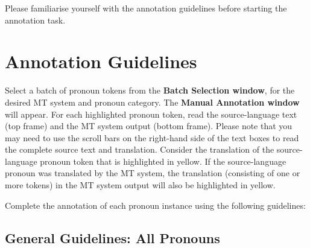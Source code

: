\documentclass[11pt]{article} %
\begin{document}
Please familiarise yourself with the annotation guidelines before starting the annotation task.

\section{Annotation Guidelines}
\label{AnnotationGuidelines}
Select a batch of pronoun tokens from the \textbf{Batch Selection window}, for the desired MT system and pronoun category. The \textbf{Manual Annotation window} will appear. For each highlighted pronoun token, read the source-language text (top frame) and the MT system output (bottom frame). Please note that you may need to use the scroll bars on the right-hand side of the text boxes to read the complete source text and translation. Consider the translation of the source-language pronoun token that is highlighted in yellow. If the source-language pronoun was translated by the MT system, the translation (consisting of one or more tokens) in the MT system output will also be highlighted in yellow.

Complete the annotation of each pronoun instance using the following guidelines:


\subsection{General Guidelines: All Pronouns}
\end{document}

